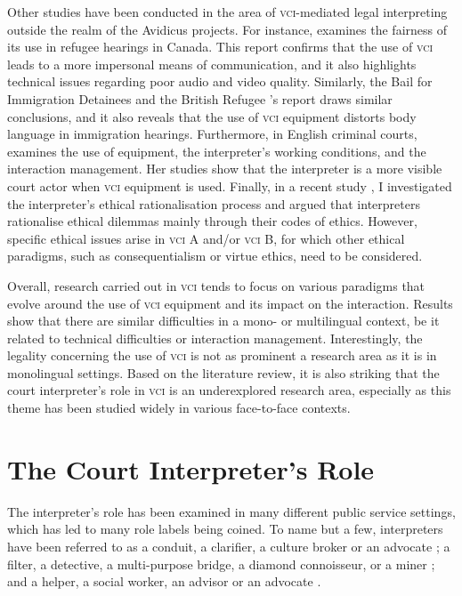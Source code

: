 \documentclass[output=paper]{langsci/langscibook}
\begin{document}
Other studies have been conducted in the area of \textsc{vci}-mediated legal interpreting outside the realm of the Avidicus projects. For instance, \citet{Ellis2004} examines the fairness of its use in refugee hearings in Canada. This report confirms that the use of \textsc{vci} leads to a more impersonal means of communication, and it also highlights technical issues regarding poor audio and video quality. Similarly, the Bail for Immigration Detainees and the British Refugee \citet{Bail2008}’s report draws similar conclusions, and it also reveals that the use of \textsc{vci} equipment distorts body language in immigration hearings. Furthermore, in English criminal courts, \citet{Fowler2012} examines the use of equipment, the interpreter’s working conditions, and the interaction management. Her studies show that the interpreter is a more visible court actor when \textsc{vci} equipment is used. Finally, in a recent study \citet{Devaux2017a}, I investigated the interpreter’s ethical rationalisation process and argued that interpreters rationalise ethical dilemmas mainly through their codes of ethics. However, specific ethical issues arise in \textsc{vci} A and/or \textsc{vci} B, for which other ethical paradigms, such as consequentialism or virtue ethics, need to be considered. 

Overall, research carried out in \textsc{vci} tends to focus on various paradigms that evolve around the use of \textsc{vci} equipment and its impact on the interaction. Results show that there are similar difficulties in a mono- or multilingual context, be it related to technical difficulties or interaction management. Interestingly, the legality concerning the use of \textsc{vci} is not as prominent a research area as it is in monolingual settings. Based on the literature review, it is also striking that the court interpreter’s role in \textsc{vci} is an underexplored research area, especially as this theme has been studied widely in various face-to-face contexts. 

\section{The Court Interpreter’s Role}
\label{sec:devaux:3}
The interpreter’s role has been examined in many different public service settings, which has led to many role labels being coined. To name but a few, interpreters have been referred to as a conduit, a clarifier, a culture broker or an advocate \citep{Niska2002}; a filter, a detective, a multi-purpose bridge, a diamond connoisseur, or a miner \citep{Angelelli2004}; and a helper, a social worker, an advisor or an advocate \citep{Grbic2011}.
\end{document}
